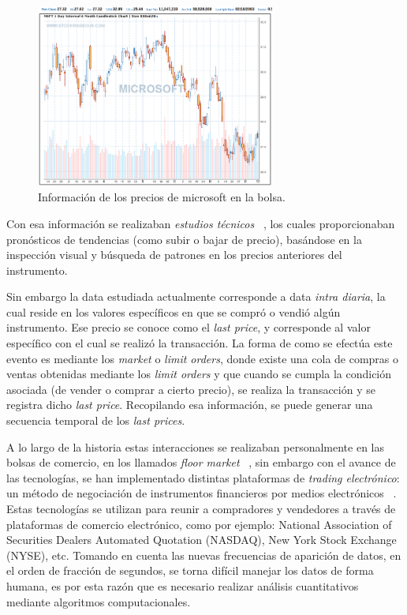 \begin{figure}[h!t]
    \begin{center}
        \includegraphics[width=0.7\textwidth]{images/microsoft}
        \caption{Información de los precios de microsoft en la bolsa.}
        \label{fig:microsoft}
    \end{center}
\end{figure}

Con esa información se realizaban \emph{estudios técnicos}
~\cite{taylor1992use}, los cuales proporcionaban pronósticos de tendencias (como
subir o bajar de precio), basándose en la inspección visual y búsqueda de
patrones en los precios anteriores del instrumento. 

Sin embargo la data estudiada actualmente corresponde a data \emph{intra
diaria}, la cual reside en los valores específicos en que se compró o vendió
algún instrumento.  Ese precio se conoce como el \emph{last price}, y
corresponde al valor específico con el cual se realizó la transacción. La forma
de como se efectúa este evento es mediante los \emph{market} o \emph{limit
orders}, donde existe una cola de compras o ventas obtenidas mediante los
\emph{limit orders} y que cuando se cumpla la condición asociada (de vender o
comprar a cierto precio), se realiza la transacción y se registra dicho
\emph{last price}. Recopilando esa información, se puede generar una secuencia
temporal de los \emph{last prices}. 

A lo largo de la historia estas interacciones se realizaban personalmente en las
bolsas de comercio, en los llamados \emph{floor market}
~\cite{jain2005financial}, sin embargo con el avance de las tecnologías, se han
implementado distintas plataformas de \emph{trading electrónico}: un método de
negociación de instrumentos financieros por medios electrónicos
~\cite{weston2002electronic}. Estas tecnologías se utilizan para reunir a
compradores y vendedores a través de plataformas de comercio electrónico, como
por ejemplo: National Association of Securities Dealers Automated Quotation
(NASDAQ), New York Stock Exchange (NYSE), etc. Tomando en cuenta las nuevas
frecuencias de aparición de datos, en el orden de fracción de segundos, se
torna difícil manejar los datos de forma humana, es por esta razón que es
necesario realizar análisis cuantitativos mediante algoritmos computacionales.

